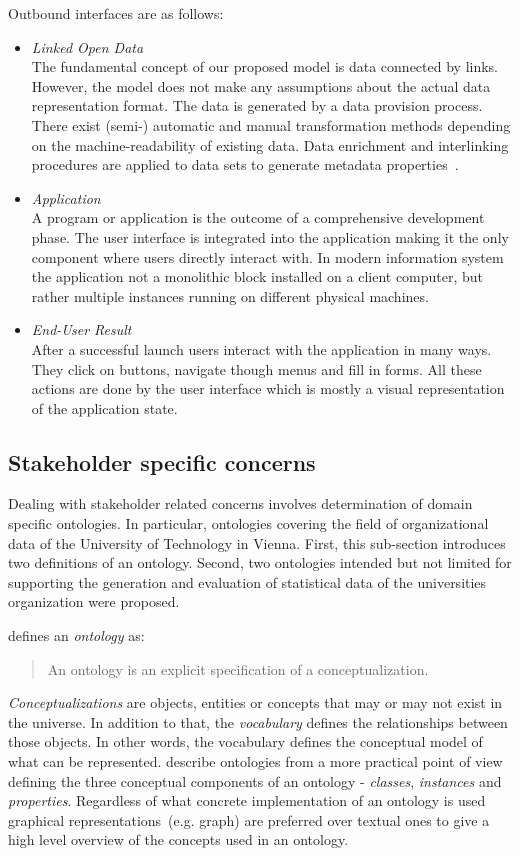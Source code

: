 \documentclass{article}
\begin{document}
Outbound interfaces are as follows:
\begin{itemize}
	\item \textit{Linked Open Data}~\\
	The fundamental concept of our proposed model is data connected by links. However, the model does not make any assumptions about the actual data representation format. The data is generated by a data provision process. There exist (semi-) automatic and manual transformation methods depending on the machine-readability of existing data. Data enrichment and interlinking procedures are applied to data sets to generate metadata properties~\cite{inproceedings:soa-architecture}. 
	\item \textit{Application}~\\
	A program or application is the outcome of a comprehensive development phase. The user interface is integrated into the application making it the only component where users directly interact with. In modern information system the application not a monolithic block installed on a client computer, but rather multiple instances running on different physical machines. 
	\item \textit{End-User Result}~\\
	After a successful launch users interact with the application in many ways. They click on buttons, navigate though menus and fill in forms. All these actions are done by the user interface which is mostly a visual representation of the application state. 
\end{itemize}

\subsection{Stakeholder specific concerns}
Dealing with stakeholder related concerns involves determination of domain specific ontologies. In particular, ontologies covering the field of organizational data of the University of Technology in Vienna. First, this sub-section introduces two definitions of an ontology. Second, two ontologies intended but not limited for supporting the generation and evaluation of statistical data of the universities organization were proposed. 

\citet{jour:gruber} defines an \textit{ontology} as:
\begin{quotation}
An ontology is an explicit specification of a conceptualization.
\end{quotation}
\textit{Conceptualizations} are objects, entities or concepts that may or may not exist in the universe. In addition to that, the \textit{vocabulary} defines the relationships between those objects. In other words, the vocabulary defines the conceptual model of what can be represented. 
\citet{jour:owl} describe ontologies from a more practical point of view defining the three conceptual components of an ontology - \textit{classes}, \textit{instances} and \textit{properties}. Regardless of what concrete implementation of an ontology is used graphical representations~(e.g. graph) are preferred over textual ones to give a high level overview of the concepts used in an ontology. 
\end{document}
